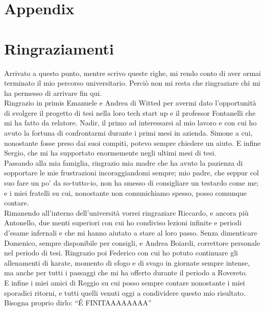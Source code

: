 \documentclass[12pt,a4paper,twoside, openright]{book}
\begin{document}
\backmatter
\cleardoublepage
{}



\appendix
{}
\chapter{Appendix}
\fancyhead{}


\chapter*{Ringraziamenti}
Arrivato a questo punto, mentre scrivo queste righe, mi rendo conto di aver ormai terminato il mio percorso universitario. Perciò non mi resta che ringraziare chi mi ha permesso di arrivare fin qui.\\
Ringrazio in primis Emanuele e Andrea di Witted per avermi dato l'opportunità di svolgere il progetto di tesi nella loro tech start up e il professor Fontanelli che mi ha fatto da relatore. Nadir, il primo ad interessarsi al mio lavoro e con cui ho avuto la fortuna di confrontarmi durante i primi mesi in azienda. Simone a cui, nonostante fosse preso dai suoi compiti, potevo sempre chiedere un aiuto. E infine Sergio, che mi ha supportato enormemente negli ultimi mesi di tesi.\\
Passando alla mia famiglia, ringrazio mia madre che ha avuto la pazienza di sopportare le mie frustrazioni incoraggiandomi sempre; mio padre, che seppur col suo fare un po' da so-tutto-io, non ha smesso di consigliare un testardo come me; e i miei fratelli su cui, nonostante non comunichiamo spesso, posso comunque contare.\\
Rimanendo all'interno dell'università vorrei ringraziare Riccardo, e ancora più Antonello, due menti superiori con cui ho condiviso lezioni infinite e periodi d'esame infernali e che mi hanno aiutato a stare al loro passo. Senza dimenticare Domenico, sempre disponibile per consigli, e Andrea Boiardi, correttore personale nel periodo di tesi.
Ringrazio poi Federico con cui ho potuto continuare gli allenamenti di karate, momento di sfogo e di svago in giornate sempre intense, ma anche per tutti i passaggi che mi ha offerto durante il periodo a Rovereto.\\
E infine i miei amici di Reggio su cui posso sempre contare nonostante i miei sporadici ritorni, e tutti quelli venuti oggi a condividere questo mio risultato.\\
Bisogna proprio dirlo: ``\'E FINITAAAAAAAA''
\end{document}
